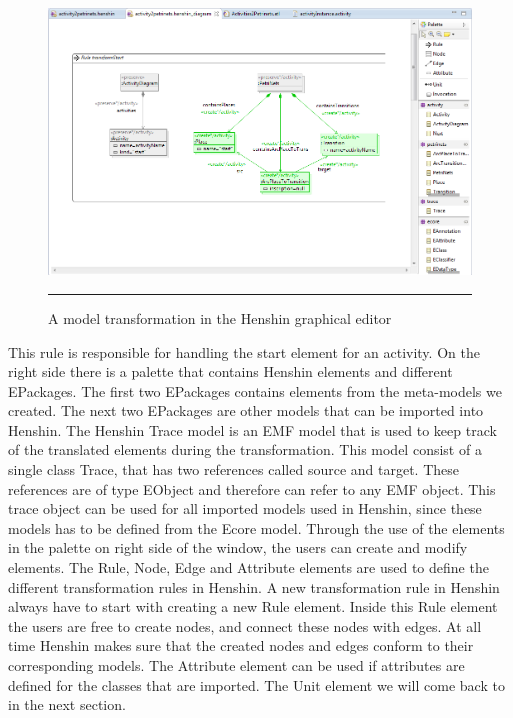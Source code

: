 \begin{figure}[H]
	\centering
	\includegraphics[scale=0.5]{figures/Henshin_Screen.png}
	\rule{35em}{0.5pt}
	\caption[The Henshin graphical editor]
	{A model transformation in the Henshin graphical editor}
	\label{fig:HenshinScreen}
\end{figure}

This rule is responsible for handling the start element for an activity.
On the right side there is a palette that contains Henshin elements and
different EPackages. The first two EPackages contains elements from the
meta-models we created. The next two EPackages are other models that can
be imported into Henshin. The Henshin Trace model is an EMF model that is used
to keep track of the translated elements during the transformation. This model
consist of a single class Trace, that has two references called source and
target. These references are of type EObject and therefore can refer to any EMF
object. This trace object can be used for all imported models used
in Henshin, since these models has to be defined from the Ecore model. Through
the use of the elements in the palette on right side of the window, the users
can create and modify elements. 
The Rule, Node, Edge and Attribute elements are used to define the different
transformation rules in Henshin. A new transformation rule in Henshin always
have to start with creating a new Rule element. Inside this Rule element the
users are free to create nodes, and connect these nodes with edges. At
all time Henshin makes sure that the created nodes and edges conform to their
corresponding models. The Attribute element can be used if attributes are
defined for the classes that are imported. The Unit element we will come back to
in the next section.

